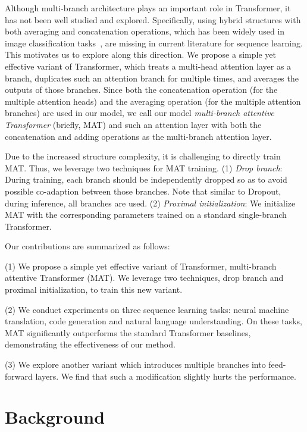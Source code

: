 \documentclass{article}
\begin{document}
Although multi-branch architecture plays an important role in Transformer, it has not been well studied and explored. Specifically, using hybrid structures with both averaging and concatenation operations, which has been widely used in image classification tasks~\cite{xie2017aggregated,szegedy2016rethinking}, are missing in current literature for sequence learning. This motivates us to explore along this direction. We propose a simple yet effective variant of Transformer, which treats a multi-head attention layer as a branch, duplicates such an attention branch for multiple times, and averages the outputs of those branches. Since both the concatenation operation (for the multiple attention heads) and the averaging operation (for the multiple attention branches) are used in our model, we call our model {\em multi-branch attentive Transformer} (briefly, MAT) and such an attention layer with both the concatenation and adding operations as the multi-branch attention layer.




Due to the increased structure complexity, it is challenging to directly train MAT. Thus, we leverage two techniques for MAT training. (1) {\em Drop branch}: During training, each branch should be independently dropped so as to avoid possible co-adaption between those branches. Note that similar to Dropout, during inference, all branches are used. (2) {\em Proximal initialization}: We initialize MAT with the corresponding parameters trained on a standard single-branch Transformer.

Our contributions are summarized as follows: 

\noindent(1) We propose a simple yet effective variant of Transformer, multi-branch attentive Transformer (MAT). We leverage two techniques, drop branch and proximal initialization, to train this new variant. 

\noindent(2) We conduct experiments on three sequence learning tasks: neural machine translation, code generation and natural language understanding. On these tasks, MAT significantly outperforms the standard Transformer baselines, demonstrating the effectiveness of our method. 

\noindent(3) We explore another variant which introduces multiple branches into feed-forward layers. We find that such a modification slightly hurts the performance. 



\section{Background}\label{sec:background}
\end{document}
